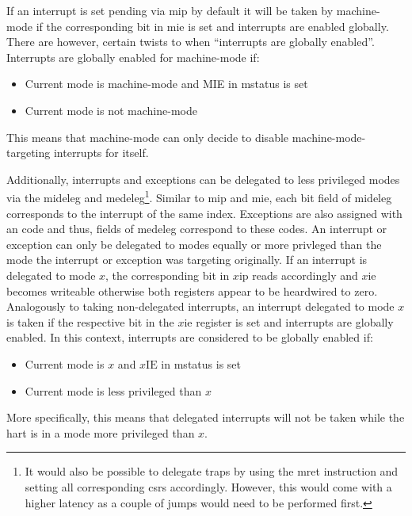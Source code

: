 If an interrupt is set pending via \gls{mip} by default it will be taken by machine-mode if the corresponding bit in \gls{mie} is set and interrupts are enabled globally.
There are however, certain twists to when \enquote{interrupts are globally enabled}.
Interrupts are globally enabled for machine-mode if:
\begin{itemize}
    \item Current mode is machine-mode and MIE in \gls{mstatus} is set
    \item Current mode is not machine-mode
\end{itemize}

This means that machine-mode can only decide to disable machine-mode-targeting interrupts for itself.

Additionally, interrupts and exceptions can be delegated to less privileged modes via the \gls{mideleg} and \gls{medeleg}\footnote{%
    It would also be possible to delegate traps by using the \gls{mret} instruction and setting all corresponding \glspl{csr} accordingly.
    However, this would come with a higher latency as a couple of jumps would need to be performed first.
}.
Similar to \gls{mip} and \gls{mie}, each bit field of \gls{mideleg} corresponds to the interrupt of the same index.
Exceptions are also assigned with an code and thus, fields of \gls{medeleg} correspond to these codes.
An interrupt or exception can only be delegated to modes equally or more privleged than the mode the interrupt or exception was targeting originally.
If an interrupt is delegated to mode $ x $, the corresponding bit in $ x\text{ip} $ reads accordingly and $ x\text{ie} $ becomes writeable otherwise both registers appear to be heardwired to zero.
Analogously to taking non-delegated interrupts, an interrupt delegated to mode $ x $ is taken if the respective bit in the $ x\text{ie} $ register is set and interrupts are globally enabled.
In this context, interrupts are considered to be globally enabled if:
\begin{itemize}
    \item Current mode is $ x $ and $ x\text{IE} $ in \gls{mstatus} is set
    \item Current mode is less privileged than $ x $
\end{itemize}

More specifically, this means that delegated interrupts will not be taken while the \gls{hart} is in a mode more privileged than $ x $.

